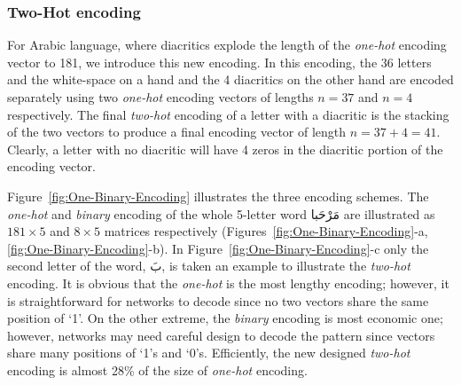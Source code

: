 \subsubsection{Two-Hot encoding}\label{sec:two-hot-encoding}
For Arabic language, where diacritics explode the length of the \textit{one-hot} encoding vector to
181, we introduce this new encoding. In this encoding, the 36 letters and the white-space on a hand
and the 4 diacritics on the other hand are encoded separately using two \textit{one-hot} encoding
vectors of lengths $n=37$ and $n=4$ respectively. The final \textit{two-hot} encoding of a
letter with a diacritic is the stacking of the two vectors to produce a final encoding vector of
length $n=37+4 = 41$. Clearly, a letter with no diacritic will have 4 zeros in the diacritic portion
of the encoding vector.

Figure~\ref{fig:One-Binary-Encoding} illustrates the three encoding schemes. The \textit{one-hot}
and \textit{binary} encoding of the whole 5-letter word \textarabic{مَرْحَبا} are illustrated as
$181 \times 5$ and $8 \times 5$ matrices respectively (Figures~\ref{fig:One-Binary-Encoding}-a,
\ref{fig:One-Binary-Encoding}-b). In Figure~\ref{fig:One-Binary-Encoding}-c only the second letter
of the word, \textarabic{بَ}, is taken an example to illustrate the \textit{two-hot} encoding. It is
obvious that the \textit{one-hot} is the most lengthy encoding; however, it is straightforward for
networks to decode since no two vectors share the same position of `1'. On the other extreme, the
\textit{binary} encoding is most economic one; however, networks may need careful design to decode
the pattern since vectors share many positions of `1's and `0's. Efficiently, the new designed
\textit{two-hot} encoding is almost 28\% of the size of \textit{one-hot} encoding.%
